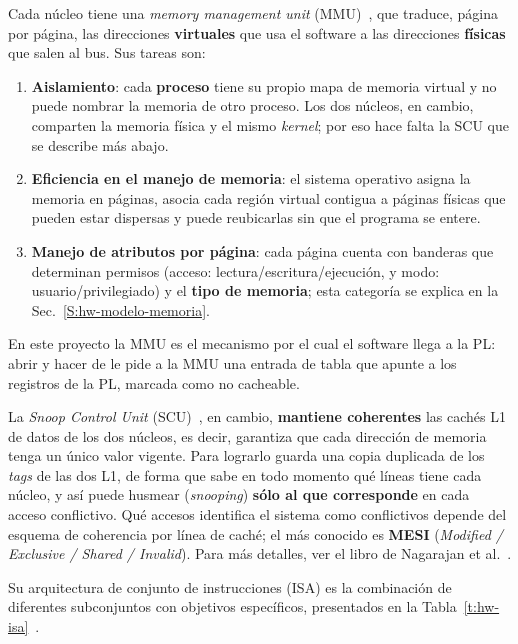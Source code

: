 Cada núcleo tiene una \emph{memory management unit} (MMU)~\cite{DDI0406C}, que
traduce, página por página, las direcciones \textbf{virtuales} que usa el
software a las direcciones \textbf{físicas} que salen al bus. Sus tareas son:
\begin{enumerate}
  \item \textbf{Aislamiento}: cada \textbf{proceso} tiene su propio mapa de
    memoria virtual y no puede nombrar la memoria de otro proceso. Los dos
    núcleos, en cambio, comparten la memoria física y el mismo \emph{kernel}; por eso
    hace falta la SCU que se describe más abajo.
  \item \textbf{Eficiencia en el manejo de memoria}: el sistema operativo asigna
    la memoria en páginas, asocia cada región virtual contigua a páginas físicas
    que pueden estar dispersas y puede reubicarlas sin que el programa se
    entere.
  \item \textbf{Manejo de atributos por página}: cada página cuenta con banderas
    que determinan permisos (acceso: lectura/escritura/ejecución, y modo:
    usuario/privilegiado) y el \textbf{tipo de memoria}; esta categoría se
    explica en la Sec.~\ref{S:hw-modelo-memoria}.
\end{enumerate}

En este proyecto la MMU es el mecanismo por el cual el software llega a la PL:
abrir  y hacer  de  le pide a
la MMU una entrada de tabla que apunte a los registros de la PL, marcada como no
cacheable.

La \emph{Snoop Control Unit} (SCU)~\cite{DDI0407}, en cambio,
\textbf{mantiene coherentes} las cachés L1 de datos de los dos núcleos, es
decir, garantiza que cada dirección de memoria tenga un único valor vigente.
Para lograrlo guarda una copia duplicada de los \emph{tags} de las dos L1, de forma que
sabe en todo momento qué líneas tiene cada núcleo, y así puede husmear
(\emph{snooping}) \textbf{sólo al que corresponde} en cada acceso conflictivo.
Qué accesos identifica el sistema como conflictivos depende del esquema de
coherencia por línea de caché; el más conocido es \textbf{MESI}
(\emph{Modified / Exclusive / Shared / Invalid}). Para más detalles, ver el
libro de Nagarajan et al.~\cite{Nagarajan2020}.

Su arquitectura de conjunto de instrucciones (ISA) es la combinación de
diferentes subconjuntos con objetivos específicos, presentados en la
Tabla~\ref{t:hw-isa}~\cite{DDI0406C}.

